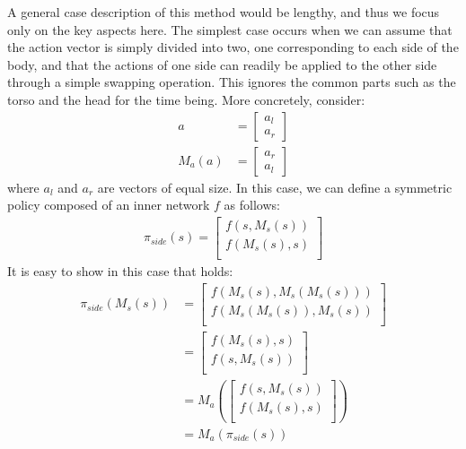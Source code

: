 A general case description of this method would be lengthy, and thus we focus only on the key aspects here. 
The simplest case occurs when we can assume that the action vector is simply divided 
into two, one corresponding to each side of the body, 
and that the actions of one side can readily be applied to the other side through a simple swapping operation.
This ignores the common parts such as the torso and the head for the time being.
More concretely, consider:
\begin{align*}
    a &= \begin{bmatrix}a_l\\a_r\end{bmatrix} \\
    M_a(a) &= \begin{bmatrix}a_r\\a_l\end{bmatrix}
\end{align*}
where $a_l$ and $a_r$ are vectors of equal size.
In this case, we can define a symmetric policy composed of an inner network $f$ as follows:
\begin{align*}
    \pi_{side}(s) = \begin{bmatrix}
    f(s,M_s(s))\\
    f(M_s(s),s)\\
    \end{bmatrix}
\end{align*}
It is easy to show in this case that  holds:
\begin{align*}
    \pi_{side}(M_s(s)) &= \begin{bmatrix}
    f(M_s(s),M_s(M_s(s)))\\
    f(M_s(M_s(s)),M_s(s))\\
    \end{bmatrix}\\
    &= \begin{bmatrix}
    f(M_s(s),s)\\
    f(s,M_s(s))\\
    \end{bmatrix}\\
    &= M_a\left( \begin{bmatrix}
    f(s,M_s(s))\\
    f(M_s(s),s)\\
    \end{bmatrix} \right)\\
    &= M_a\left(\pi_{side}(s)\right)
\end{align*}

